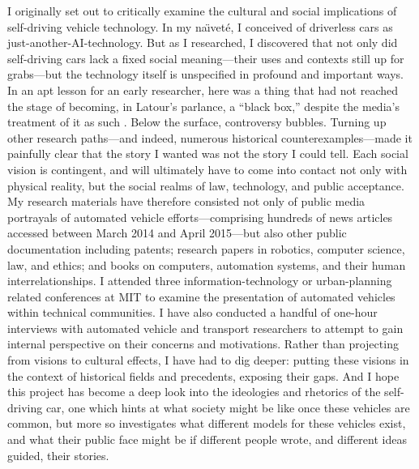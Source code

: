 


I originally set out to critically examine the cultural and social
implications of self-driving vehicle technology. In my na\"{\i}vet\'{e}, I
conceived of driverless cars as just-another-AI-technology. But as I
researched, I discovered that not only did 
self-driving cars lack a fixed social meaning---their uses and
contexts still up for grabs---but the technology itself is unspecified
in profound and important ways. In an apt lesson for an early researcher,
here was a thing that had not reached the stage of becoming, in
Latour's parlance, a ``black box,'' despite the media's treatment of
it as such \cite{LatourScience}. Below the surface, controversy
bubbles. Turning up other research paths---and indeed, numerous historical
counterexamples---made it painfully clear that the story I wanted was
not the story I could tell. Each social vision is
contingent, and will ultimately have to come into
contact not only with physical reality, but the social realms of law,
technology, and public acceptance. My research materials have
therefore consisted not only of public media portrayals of automated
vehicle efforts---comprising hundreds of news articles accessed
between March 2014 and April 2015---but also other public
documentation including patents; research papers in robotics,
computer science, law, and ethics; and books on computers, automation systems,
and their human 
interrelationships. I attended three information-technology or urban-planning
related conferences at MIT to examine the presentation of automated
vehicles within technical communities. I have also conducted a handful
of one-hour interviews with 
automated vehicle and transport researchers to attempt to gain
internal perspective on their concerns and motivations. Rather than
projecting from visions to cultural effects, I have had to dig deeper:
putting these visions in the context of 
historical fields and precedents, exposing their gaps. And I hope this project has become a  
deep look into the ideologies and rhetorics of the self-driving car,
one which hints at what society might be like once these
vehicles are common, but more so investigates what different models for these vehicles
exist, and what their public face might be if different people wrote,
and different ideas guided, their stories.

